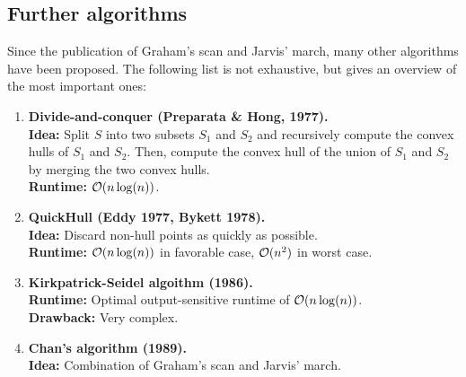     \subsection{Further algorithms}
        Since the publication of Graham's scan and Jarvis' march, many other algorithms have been proposed. The following list is not exhaustive, but gives an overview of the most important ones:
        \begin{enumerate}
            \item \textbf{Divide-and-conquer (Preparata \& Hong, 1977).} \\
            \textbf{Idea:} Split $S$ into two subsets $S_1$ and $S_2$ and recursively compute the convex hulls of $S_1$ and $S_2$. Then, compute the convex hull of the union of $S_1$ and $S_2$ by merging the two convex hulls. \\
            \textbf{Runtime:} $\mathcal{O}(n\log(n))$.

            \item \textbf{QuickHull (Eddy 1977, Bykett 1978).} \\
            \textbf{Idea:} Discard non-hull points as quickly as possible. \\
            \textbf{Runtime:} $\mathcal{O}(n\log(n))$ in favorable case, $\mathcal{O}(n^2)$ in worst case.

            \item \textbf{Kirkpatrick-Seidel algoithm (1986).} \\
            \textbf{Runtime:} Optimal output-sensitive runtime of $\mathcal{O}(n\log(n))$. \\
            \textbf{Drawback:} Very complex.

            \item \textbf{Chan's algorithm (1989).} \\
            \textbf{Idea:} Combination of Graham's scan and Jarvis' march. 
        \end{enumerate}

